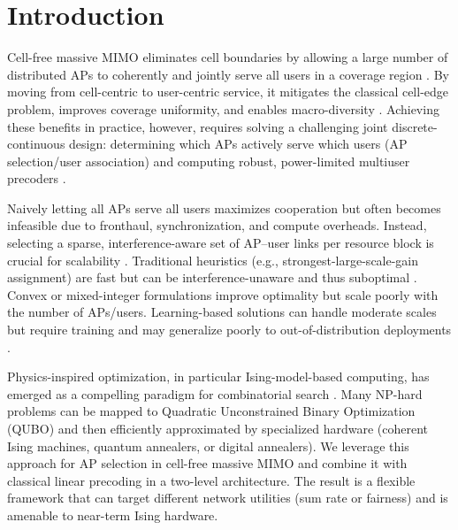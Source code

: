\section{Introduction}
Cell-free massive MIMO eliminates cell boundaries by allowing a large number of distributed APs to coherently and jointly serve all users in a coverage region \cite{ngo2017cell,demir2021foundations}. By moving from cell-centric to user-centric service, it mitigates the classical cell-edge problem, improves coverage uniformity, and enables macro-diversity \cite{buzzi2019user}. Achieving these benefits in practice, however, requires solving a challenging joint discrete-continuous design: determining which APs actively serve which users (AP selection/user association) and computing robust, power-limited multiuser precoders \cite{nayebi2017precoding,bjornson2019making}.

Naively letting all APs serve all users maximizes cooperation but often becomes infeasible due to fronthaul, synchronization, and compute overheads. Instead, selecting a sparse, interference-aware set of AP–user links per resource block is crucial for scalability \cite{interdonato2019scalability,chen2020structured}. Traditional heuristics (e.g., strongest-large-scale-gain assignment) are fast but can be interference-unaware and thus suboptimal \cite{zhang2019cell}. Convex or mixed-integer formulations improve optimality but scale poorly with the number of APs/users. Learning-based solutions can handle moderate scales but require training and may generalize poorly to out-of-distribution deployments \cite{elsherif2022resource,zappone2021uplink}.

Physics-inspired optimization, in particular Ising-model-based computing, has emerged as a compelling paradigm for combinatorial search \cite{lucas2014ising,mcmahon2016fully,inagaki2016coherent,kasi2021resource,grassl2022ising}. Many NP-hard problems can be mapped to Quadratic Unconstrained Binary Optimization (QUBO) and then efficiently approximated by specialized hardware (coherent Ising machines, quantum annealers, or digital annealers). We leverage this approach for AP selection in cell-free massive MIMO and combine it with classical linear precoding in a two-level architecture. The result is a flexible framework that can target different network utilities (sum rate or fairness) and is amenable to near-term Ising hardware.

